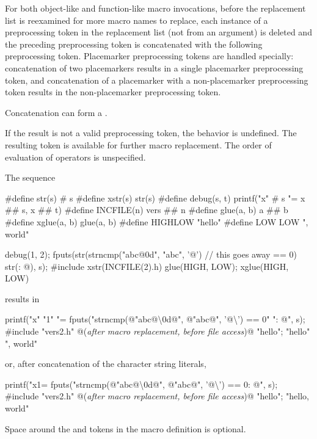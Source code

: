 \pnum
For both object-like and function-like macro invocations, before the
replacement list is reexamined for more macro names to replace,
each instance of a
\tcode{\#\#}
preprocessing token in the replacement list
(not from an argument) is deleted and the
preceding preprocessing token is concatenated
with the following preprocessing token.
Placemarker preprocessing tokens are handled specially: concatenation
of two placemarkers results in a single placemarker preprocessing token, and
concatenation of a placemarker with a non-placemarker preprocessing token results
in the non-placemarker preprocessing token.
\begin{note}
Concatenation can form
a .
\end{note}
If the result is not a valid preprocessing token,
the behavior is undefined.
The resulting token is available for further macro replacement.
The order of evaluation of
\tcode{\#\#}
operators is unspecified.

\pnum
\begin{example}
The sequence
\begin{codeblock}
#define str(s)      # s
#define xstr(s)     str(s)
#define debug(s, t) printf("x" # s "= %
               x ## s, x ## t)
#define INCFILE(n)  vers ## n
#define glue(a, b)  a ## b
#define xglue(a, b) glue(a, b)
#define HIGHLOW     "hello"
#define LOW         LOW ", world"

debug(1, 2);
fputs(str(strncmp("abc@\textbackslash@0d", "abc", '@')        // this goes away
    == 0) str(: @\atsign\textbackslash@n), s);
#include xstr(INCFILE(2).h)
glue(HIGH, LOW);
xglue(HIGH, LOW)
\end{codeblock}
results in
\begin{codeblock}
printf("x" "1" "= %
fputs("strncmp(@\textbackslash@"abc@\textbackslash\textbackslash@0d@\textbackslash@", @\textbackslash@"abc@\textbackslash@", '@\textbackslash{}') == 0" ": @\atsign\textbackslash@n", s);
#include "vers2.h"      @\textrm{(\textit{after macro replacement, before file access})}@
"hello";
"hello" ", world"
\end{codeblock}
or, after concatenation of the character string literals,
\begin{codeblock}
printf("x1= %
fputs("strncmp(@\textbackslash@"abc@\textbackslash\textbackslash@0d@\textbackslash@", @\textbackslash@"abc@\textbackslash@", '@\textbackslash{}') == 0: @\atsign\textbackslash@n", s);
#include "vers2.h"      @\textrm{(\textit{after macro replacement, before file access})}@
"hello";
"hello, world"
\end{codeblock}

Space around the \tcode{\#} and \tcode{\#\#} tokens in the macro definition
is optional.
\end{example}

